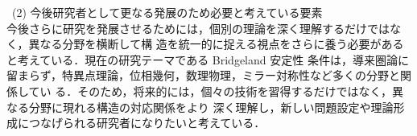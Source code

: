 \documentclass[11pt,a4paper]{ltjsarticle}
\newcommand{\研究課題名}{軌道体射影直線の導来圏の半直交分解とBridgeland安定性条件に関する研究}
\newcommand{\研究機関名}{大阪大学}
\newcommand{\研究代表者氏名}{山本 雄大}
\begin{document}
\vspace{2mm}

\bullet\ (2) 今後研究者として更なる発展のため必要と考えている要素\\
今後さらに研究を発展させるためには，個別の理論を深く理解するだけではなく，異なる分野を横断して構
造を統一的に捉える視点をさらに養う必要があると考えている．現在の研究テーマである Bridgeland 安定性
条件は，導来圏論に留まらず，特異点理論，位相幾何，数理物理，ミラー対称性など多くの分野と関係してい
る．そのため，将来的には，個々の技術を習得するだけではなく，異なる分野に現れる構造の対応関係をより
深く理解し，新しい問題設定や理論形成につなげられる研究者になりたいと考えている．
\vspace{5mm}
\noindent



\end{document}
